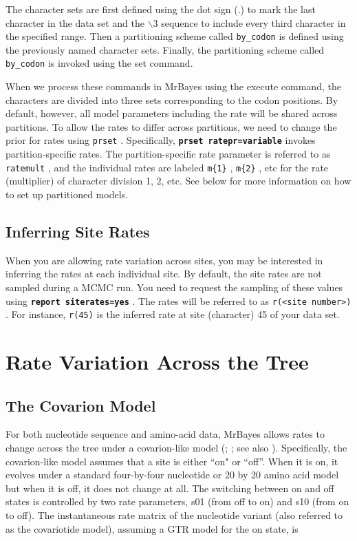 \documentclass[12pt]{book}
\newcommand{\ttt}[1]{\texttt{#1} }
\newcommand{\tb}[1]{\texttt{\textbf{#1}} }
\begin{document}
The character sets are first defined using the dot sign (.) to mark the last character in the data
set and the $\backslash$3 sequence to include every third character in the specified range. Then a
partitioning scheme called \ttt{by\_codon} is defined using the previously named character sets.
Finally, the partitioning scheme called \ttt{by\_codon} is invoked using the set command.

When we process these commands in MrBayes using the execute command, the characters are divided
into three sets corresponding to the codon positions. By default, however, all model parameters
including the rate will be shared across partitions. To allow the rates to differ across
partitions, we need to change the prior for rates using \ttt{prset}. Specifically, \tb{prset
ratepr=variable} invokes partition-specific rates.  The partition-specific rate parameter is
referred to as \ttt{ratemult}, and the individual rates are labeled \ttt{m\{1\}}, \ttt{m\{2\}}, etc
for the rate (multiplier) of character division 1, 2, etc. See below for more information on how to
set up partitioned models.

\subsection{Inferring Site Rates}
When you are allowing rate variation across sites, you may be interested in inferring the rates at
each individual site. By default, the site rates are not sampled during a MCMC run. You need to
request the sampling of these values using \tb{report siterates=yes}. The rates will be referred to
as \ttt{r(<site number>)}. For instance, \ttt{r(45)} is the inferred rate at site (character) 45 of
your data set.

\section{Rate Variation Across the Tree}

\subsection{The Covarion Model}
For both nucleotide sequence and amino-acid data, MrBayes allows rates to change across the tree
under a covarion-like model (\citet{tuffley98}; \citet{huelsenbeck02a}; see also
\citet{galtier01}). Specifically, the covarion-like model assumes that a site is either ``on" or
``off''. When it is on, it evolves under a standard four-by-four nucleotide or 20 by 20 amino acid
model but when it is off, it does not change at all. The switching between on and off states is
controlled by two rate parameters, s01 (from off to on) and s10 (from on to off). The instantaneous
rate matrix of the nucleotide variant (also referred to as the covariotide model), assuming a GTR
model for the on state, is
\end{document}
